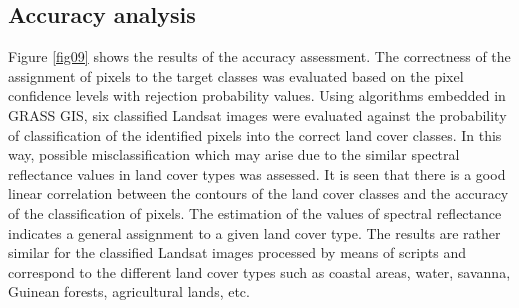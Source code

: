 \documentclass[earth,article,submit,pdftex,moreauthors]{Definitions/mdpi}
\begin{document}
\subsection{{Accuracy analysis}}

Figure \ref{fig09} shows the {results of the }accuracy {assessment}. {The correctness of the assignment of pixels to the target classes was }evaluated based on the pixel confidence levels with rejection probability values{. Using algorithms embedded in GRASS GIS, six classified} Landsat images {were }evaluated against the probability of classification of the{ identified }pixels into {the }correct land cover classes{. In this way, }possible misclassification {which may arise due} to the similar spectral reflectance values in land cover types {was assessed}. It is seen that there {is a} good linear correlation{ }between the contours of {the }land cover classes and the accuracy of the classification of pixels{. The estimation of the values of }spectral reflectance {indicates} a general assignment to a given land cover type. The results are rather similar {for the classified } Landsat images processed by means of {scripts and correspond to} the different land cover types {such as }coastal {areas}, water, savanna, Guinean forests, agricultural lands, etc{.} 
\end{document}
